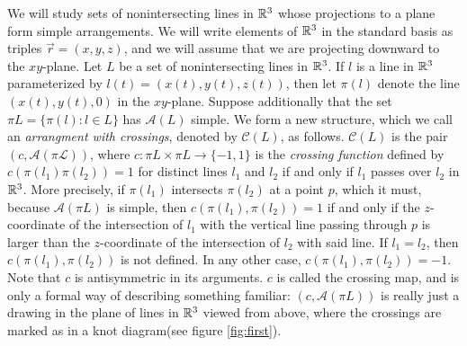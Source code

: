 \documentclass[11pt, oneside]{article}
\begin{document}
We will study sets of nonintersecting lines in $\mathbb{R}^3$ whose projections to a plane form simple arrangements. We will write elements of $\mathbb{R}^3$ in the standard basis as triples $\vec{r} = (x, y, z)$, and we will assume that we are projecting downward to the $xy$-plane. Let $L$ be a set of nonintersecting lines in $\mathbb{R}^3$. If $l$ is a line in $\mathbb{R}^3$ parameterized by $l(t) = (x(t), y(t), z(t))$, then let $\pi(l)$ denote the line $(x(t), y(t), 0)$ in the $xy$-plane. Suppose additionally that the set $\pi L = \{\pi(l): l \in L\}$ has $\mathcal{A}(L)$ simple. We form a new structure, which we call an \emph{arrangment with crossings}, denoted by $\mathcal{C}(L)$, as follows. $\mathcal{C}(L)$ is the pair $(c, \mathcal{A(\pi L)})$, where $c: \pi L \times \pi L \to \{-1, 1\}$ is the \emph{crossing function} defined by $c(\pi(l_1) \pi(l_2)) = 1$ for distinct lines $l_1$ and $l_2$ if and only if $l_1$ passes over $l_2$ in $\mathbb{R}^3$. More precisely, if $\pi(l_1)$ intersects $\pi(l_2)$ at a point $p$, which it must, because $\mathcal{A}(\pi L)$ is simple, then $c(\pi(l_1), \pi(l_2)) = 1$ if and only if the $z$-coordinate of the intersection of $l_1$ with the vertical line passing through $p$ is larger than the $z$-coordinate of the intersection of $l_2$ with said line. If $l_1 = l_2$, then $c(\pi(l_1), \pi(l_2))$ is not defined. In any other case, $c(\pi(l_1), \pi(l_2)) = -1$. Note that $c$ is antisymmetric in its arguments. $c$ is called the crossing map, and is only a formal way of describing something familiar: $(c, \mathcal{A}(\pi L))$ is really just a drawing in the plane of lines in $\mathbb{R}^3$ viewed from above, where the crossings are marked as in a knot diagram(see figure \ref{fig:first}). \\
\end{document}
